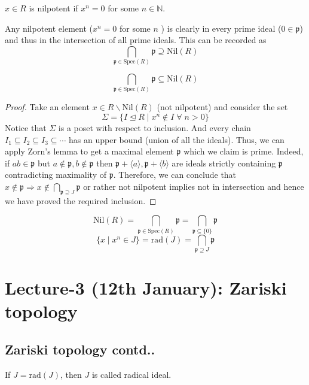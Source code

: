 \documentclass[oneside, 12pt]{scrbook}
\newcommand{\NN}{\mathbb N}
\newcommand{\spec}{\mathrm{Spec}}
\newcommand{\pr}{\mathfrak{p}}
\newcommand{\nil}{\mathrm{Nil}}
\theoremstyle{theorem}
\begin{document}
\begin{definition}
$x\in R$ is nilpotent if $x^n =0$ for some $n \in \NN$.
\end{definition}

\begin{remark}
Any nilpotent element ($x^n = 0$ for some $n$ ) is clearly in every prime ideal ($0 \in \mathfrak{p}$) and thus in the intersection of all prime ideals. This can be recorded as $$\bigcap_{\pr \in \spec(R)} \pr \supseteq \nil(R)$$
\end{remark}

\begin{proposition}
$$\bigcap_{\pr \in \spec(R)} \pr \subseteq \nil(R)$$
\end{proposition}

\begin{proof}
Take an element $x \in R \backslash \nil(R)$ (not nilpotent) and consider the set $$\Sigma = \{ I \unlhd R \mid x^n \not \in I \; \forall \; n >0\}$$
Notice that $\Sigma$ is a poset with respect to inclusion. And every chain $I_{1} \subseteq I_{2} \subseteq I_{3} \subseteq \cdots $ has an upper bound (union of all the ideals). Thus, we can apply Zorn's lemma to get a maximal element $\pr$ which we claim is prime. Indeed, if $ab \in \pr$ but $a\not \in \pr, b \not \in \pr$ then $\pr + \langle a \rangle, \pr + \langle b \rangle$ are ideals strictly containing $\pr$ contradicting maximality of $\pr$. Therefore, we can conclude that $x \not \in \pr \Rightarrow x \not \in \bigcap_{\pr \supseteq J} \pr$ or rather not nilpotent implies not in intersection and hence we have proved the required inclusion. 
\end{proof}

$$\nil (R) = \bigcap_{\pr \in \spec (R)} \pr = \bigcap_{\pr \subseteq \{0\}} \pr$$
$$\{x \mid x^n \in J\} = \mathrm{rad}(J) = \bigcap_{\pr \supseteq J} \pr $$

\chapter{Lecture-3 (12th January): Zariski topology }

\section{Zariski topology contd..}

\begin{definition}
If $J = \mathrm{rad}(J)$, then $J$ is called radical ideal.
\end{definition}
\end{document}
